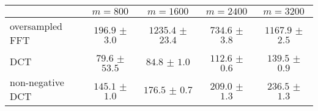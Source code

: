 \centering
\renewcommand{\arraystretch}{1.2}
\begin{tabular}{@{}lcccc@{}}
\toprule
 & $m=800$ & $m=1600$ & $m=2400$ & $m=3200$\\
\midrule
oversampled FFT & $196.9$ $\pm$ $3.0$ & $1235.4$ $\pm$ $23.4$ & $734.6$ $\pm$ $3.8$ & $1167.9$ $\pm$ $2.5$ \\
DCT & $79.6$ $\pm$ $53.5$ & $84.8$ $\pm$ $1.0$ & $112.6$ $\pm$ $0.6$ & $139.5$ $\pm$ $0.9$ \\
non-negative DCT & $145.1$ $\pm$ $1.0$ & $176.5$ $\pm$ $0.7$ & $209.0$ $\pm$ $1.3$ & $236.5$ $\pm$ $1.3$ \\
\bottomrule
\end{tabular}
